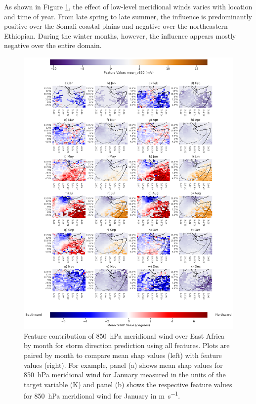 As shown in Figure \ref{fig:storm_direction_all_shap_mean_v850_map_by_month}, the effect of low-level meridional winds varies with location and time of year. From late spring to late summer, the influence is predominantly positive over the Somali coastal plains and negative over the northeastern Ethiopian. During the winter months, however, the influence appears mostly negative over the entire domain.

\begin{figure}[ht]
    \centering
    \includegraphics[width=\textwidth]{../figures/generated/experiments/storm_direction/geographic_corr/storm_direction_all_shap_mean_v850_map_by_month.png}
    \caption{Feature contribution of \SI{850}{\hecto\pascal} meridional wind over East Africa by month for storm direction prediction using all features. Plots are paired by month to compare mean \acrshort{shap} values (left) with feature values (right). For example, panel (a) shows mean \acrshort{shap} values for \SI{850}{\hecto\pascal} meridional wind for January measured in the units of the target variable (\unit{\kelvin}) and panel (b) shows the respective feature values for \SI{850}{\hecto\pascal} meridional wind for January in \unit{\meter\per\second}.}
    \label{fig:storm_direction_all_shap_mean_v850_map_by_month}
\end{figure}

